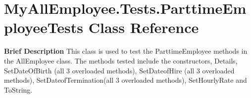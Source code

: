 \hypertarget{class_my_all_employee_1_1_tests_1_1_parttime_employee_tests}{}\section{My\+All\+Employee.\+Tests.\+Parttime\+Employee\+Tests Class Reference}
\label{class_my_all_employee_1_1_tests_1_1_parttime_employee_tests}


{\bfseries  Brief Description} This class is used to test the Parttime\+Employee methods in the All\+Employee class. The methods tested include the constructors, Details, Set\+Date\+Of\+Birth (all 3 overloaded methods), Set\+Dateof\+Hire (all 3 overloaded methods), Set\+Dateof\+Termination(all 3 overloaded methods), Set\+Hourly\+Rate and To\+String.  


